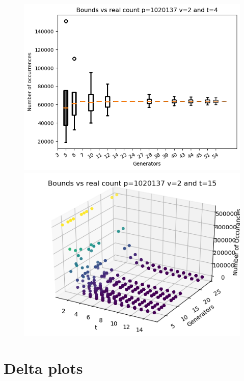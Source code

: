 \documentclass{article}
\begin{document}
\begin{figure}[H]
    \begin{minipage}{.49\textwidth}
            \centering
            \includegraphics[width=\textwidth]{../plots/tuples_figures/other/boxplot_p1020137_v2_t4.png}
    \end{minipage}
    \begin{minipage}{.49\textwidth}
            \centering
            \includegraphics[width=\textwidth]{../plots/tuples_figures/other/test_p1020137_v2.png}
    \end{minipage}
\end{figure}

\section{Delta plots}
\end{document}

